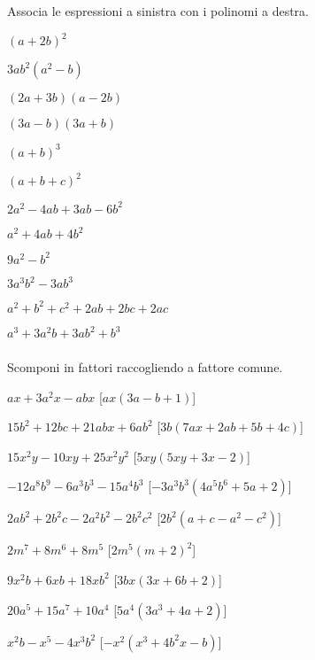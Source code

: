 \begin{esercizio}
\label{ese:div.008}
Associa le espressioni a sinistra con i polinomi a destra.
  \begin{multicols}{2}
\begin{enumeratea}
\item \((a+2b)^{2}\)
\item \(3ab^{2}(a^{2}-b)\)
\item \((2a+3b)(a-2b)\)
\item \((3a-b)(3a+b)\)
\item \((a+b)^{3}\)
\item \((a+b+c)^{2}\)
\item \(2a^{2}-4ab+3ab-6b^{2}\)
\item \(a^{2}+4ab+4b^{2}\)
\item \(9a^{2}-b^{2}\)
\item \(3a^{3}b^{2}-3ab^{3}\)
\item \(a^{2}+b^{2}+c^{2}+2ab+2bc+2ac\)
\item \(a^{3}+3a^{2}b+3ab^{2}+b^{3}\)
\end{enumeratea}
  \end{multicols}
\end{esercizio}

\subsubsection*{}

\begin{esercizio}[\Ast]
\label{ese:div.009}
Scomponi in fattori raccogliendo a fattore comune.
\begin{enumeratea}
 \item \(ax+3a^{2}x-abx\) \hfill [\(ax(3a-b+1)\)]
 \item \(15b^{2}+12bc+21abx+6ab^{2}\) \hfill [\(3b(7ax+2ab+5b+4c)\)]
 \item \(15x^{2}y-10xy+25x^{2}y^{2}\) \hfill [\(5xy(5xy+3x-2)\)]
 \item \(-12a^{8}b^{9}-6a^{3}b^{3}-15a^{4}b^{3}\) 
  \hfill [\(-3a^{3}b^{3}\left(4a^{5}b^{6}+5a+2\right)\)]
 \item \(2ab^{2}+2b^{2}c-2a^{2}b^{2}-2b^{2}c^{2}\) 
  \hfill [\(2b^{2}(a+c-a^{2}-c^{2})\)]
 \item \(2m^{7}+8m^{6}+8m^{5}\) 
  \hfill [\(2m^{5}\left(m+2\right)^{2}\)]
 \item \(9x^{2}b+6xb+18xb^{2}\) \hfill [\(3bx(3x+6b+2)\)]
 \item \(20a^{5}+15a^{7}+10a^{4}\) \hfill [\(5a^{4}\left(3a^{3}+4a+2\right)\)]
 \item \(x^{2}b-x^{5}-4x^{3}b^{2}\) \hfill [\(-x^{2}\left(x^{3}+4b^{2}x-b\right)\)]
\end{enumeratea}
\end{esercizio}

